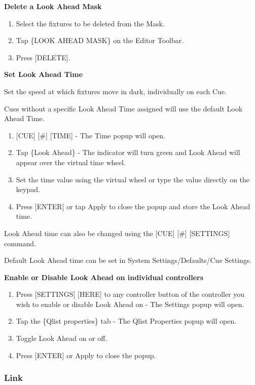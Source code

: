 \documentclass[
]{article}
\begin{document}
\textbf{Delete a Look Ahead Mask}

\begin{enumerate}
\def\labelenumi{\arabic{enumi}.}
\item
  Select the fixtures to be deleted from the Mask.
\item
  Tap \{LOOK AHEAD MASK\} on the Editor Toolbar.
\item
  Press {[}DELETE{]}.
\end{enumerate}

\textbf{Set Look Ahead Time}

Set the speed at which fixtures move in dark, individually on each Cue.

Cues without a specific Look Ahead Time assigned will use the default Look Ahead Time.

\begin{enumerate}
\def\labelenumi{\arabic{enumi}.}
\item
  {[}CUE{]} {[}\#{]} {[}TIME{]} - The Time popup will open.
\item
  Tap \{Look Ahead\} - The indicator will turn green and Look Ahead will appear over the virtual time wheel.
\item
  Set the time value using the virtual wheel or type the value directly on the keypad.
\item
  Press {[}ENTER{]} or tap Apply to close the popup and store the Look Ahead time.
\end{enumerate}

Look Ahead time can also be changed using the {[}CUE{]} {[}\#{]} {[}SETTINGS{]} command.

Default Look Ahead time can be set in System Settings/Defaults/Cue Settings.

\textbf{Enable or Disable Look Ahead on individual controllers}

\begin{enumerate}
\def\labelenumi{\arabic{enumi}.}
\item
  Press {[}SETTINGS{]} {[}HERE{]} to any controller button of the controller you wish to enable or disable Look Ahead on - The Settings popup will open.
\item
  Tap the \{Qlist properties\} tab - The Qlist Properties popup will open.
\item
  Toggle Look Ahead on or off.
\item
  Press {[}ENTER{]} or Apply to close the popup.
\end{enumerate}

\hypertarget{link}{%
\subsubsection{Link}\label{link}}
\end{document}
